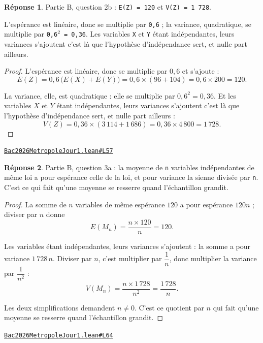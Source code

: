 \documentclass[11pt,a4paper]{article}
\theoremstyle{definition}
\theoremstyle{plain}
\theoremstyle{definition}
\newtheorem*{reponse}{Réponse}
\newcommand{\source}[2]{\par\smallskip\noindent\hfill{\footnotesize\href{#1}{\texttt{#2}}}\par\smallskip}
\begin{document}
\begin{reponse}
Partie B, question 2b : \texttt{E(Z) = 120} et \texttt{V(Z) = 1 728}.

L'espérance est linéaire, donc se multiplie par \texttt{0,6} ; la variance, quadratique, se
multiplie par \texttt{0,6\(^{2}\) = 0,36}. Les variables \texttt{X} et \texttt{Y} étant indépendantes, leurs
variances s'ajoutent \textemdash{} c'est là que l'hypothèse d'indépendance sert, et nulle part
ailleurs.
\end{reponse}
\begin{proof}
L'espérance est linéaire, donc se multiplie par $0{,}6$ et s'ajoute :
\[ E(Z) = 0{,}6\,\bigl(E(X) + E(Y)\bigr) = 0{,}6 \times (96 + 104) = 0{,}6 \times 200 = 120 . \]

La variance, elle, est quadratique : elle se multiplie par $0{,}6^2 = 0{,}36$. Et les
variables $X$ et $Y$ étant indépendantes, leurs variances s'ajoutent \textemdash{} c'est
là que l'hypothèse d'indépendance sert, et nulle part ailleurs :
\[ V(Z) = 0{,}36 \times (3\,114 + 1\,686) = 0{,}36 \times 4\,800 = 1\,728 . \]
\end{proof}
\source{https://github.com/Commutator-IO/learn-lean/blob/main/exams/2026/Bac2026MetropoleJour1.lean\#L57}{Bac2026MetropoleJour1.lean\#L57}

\begin{reponse}
Partie B, question 3a : la moyenne de \texttt{n} variables indépendantes de même loi a
pour espérance celle de la loi, et pour variance la sienne divisée par \texttt{n}. C'est ce
qui fait qu'une moyenne se resserre quand l'échantillon grandit.
\end{reponse}
\begin{proof}
La somme de $n$ variables de même espérance $120$ a pour espérance $120n$ ; diviser par $n$
donne
\[ E(M_n) = \frac{n \times 120}{n} = 120 . \]

Les variables étant indépendantes, leurs variances s'ajoutent : la somme a pour variance
$1\,728\,n$. Diviser par $n$, c'est multiplier par $\dfrac{1}{n}$, donc multiplier la
variance par $\dfrac{1}{n^2}$ :
\[ V(M_n) = \frac{n \times 1\,728}{n^2} = \frac{1\,728}{n} . \]

Les deux simplifications demandent $n \ne 0$. C'est ce quotient par $n$ qui fait qu'une
moyenne se resserre quand l'échantillon grandit.
\end{proof}
\source{https://github.com/Commutator-IO/learn-lean/blob/main/exams/2026/Bac2026MetropoleJour1.lean\#L64}{Bac2026MetropoleJour1.lean\#L64}
\end{document}
